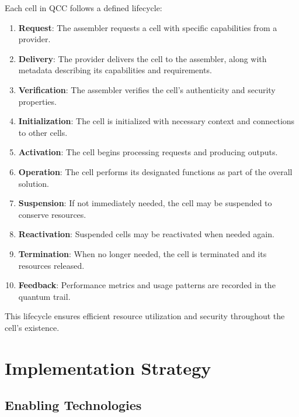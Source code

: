 \documentclass[11pt,a4paper]{article}
\begin{document}
Each cell in QCC follows a defined lifecycle:

\begin{enumerate}
    \item \textbf{Request}: The assembler requests a cell with specific capabilities from a provider.
    
    \item \textbf{Delivery}: The provider delivers the cell to the assembler, along with metadata describing its capabilities and requirements.
    
    \item \textbf{Verification}: The assembler verifies the cell's authenticity and security properties.
    
    \item \textbf{Initialization}: The cell is initialized with necessary context and connections to other cells.
    
    \item \textbf{Activation}: The cell begins processing requests and producing outputs.
    
    \item \textbf{Operation}: The cell performs its designated functions as part of the overall solution.
    
    \item \textbf{Suspension}: If not immediately needed, the cell may be suspended to conserve resources.
    
    \item \textbf{Reactivation}: Suspended cells may be reactivated when needed again.
    
    \item \textbf{Termination}: When no longer needed, the cell is terminated and its resources released.
    
    \item \textbf{Feedback}: Performance metrics and usage patterns are recorded in the quantum trail.
\end{enumerate}

This lifecycle ensures efficient resource utilization and security throughout the cell's existence.

\section{Implementation Strategy}

\subsection{Enabling Technologies}
\end{document}

